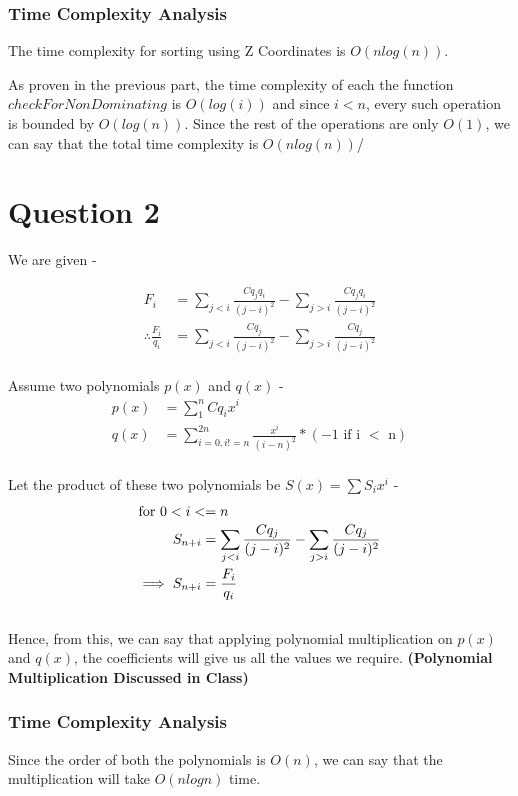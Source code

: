 \documentclass{article}
\begin{document}
            \subsubsection*{Time Complexity Analysis}
                
                The time complexity for sorting using Z Coordinates is $O(nlog(n))$.
            
                As proven in the previous part, the time complexity of each the function $checkForNonDominating$ is $O(log(i))$ and since $i < n$, every such operation is bounded by $O(log(n))$. Since the rest of the operations are only $O(1)$, we can say that the total time complexity is $O(nlog(n))$/


\section*{Question 2}
    
    We are given - 
    
    \begin{align*}
        F_i &= \sum_{j < i}{\frac{Cq_jq_i}{(j - i) ^ 2}} - \sum_{j > i}{\frac{Cq_jq_i}{(j - i) ^ 2}} \\
        \therefore \frac{F_i}{q_i} &= \sum_{j < i}{\frac{Cq_j}{(j - i) ^ 2}} - \sum_{j > i}{\frac{Cq_j}{(j - i) ^ 2}}
    \end{align*}
    \\
    Assume two polynomials $p(x)$ and $q(x)$ -
    \begin{align*}
        p(x) &= \sum_{1}^{n}{Cq_ix^i} \\
        q(x) &= \sum_{i=0, i!=n}^{2n}{\frac{x^i}{(i - n)^2} * (\text{$-1$ if i $<$ n})}
    \end{align*}
    \\
    Let the product of these two polynomials be $S(x) = \sum{S_ix^i}$ -
    \begin{align*}
        \intertext{for $0 < i <= n$}
        S_{n+i} &= \sum_{j < i}{\frac{Cq_j}{(j - i)^2}} - \sum_{j > i}{\frac{Cq_j}{(j - i)^2}} \\
        \implies S_{n+i} &= \frac{F_i}{q_i}
    \end{align*}
    \\
    Hence, from this, we can say that applying polynomial multiplication on $p(x)$ and $q(x)$, the coefficients will give us all the values we require. \textbf{(Polynomial Multiplication Discussed in Class)}
    
    \subsubsection*{Time Complexity Analysis}
    
        Since the order of both the polynomials is $O(n)$, we can say that the multiplication will take $O(nlogn)$ time.
\end{document}
